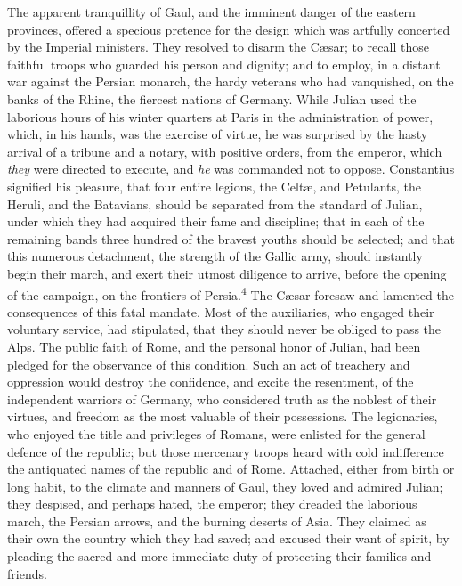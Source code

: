 
The apparent tranquillity of Gaul, and the imminent danger of the
eastern provinces, offered a specious pretence for the design
which was artfully concerted by the Imperial ministers. They
resolved to disarm the Cæsar; to recall those faithful troops who
guarded his person and dignity; and to employ, in a distant war
against the Persian monarch, the hardy veterans who had
vanquished, on the banks of the Rhine, the fiercest nations of
Germany. While Julian used the laborious hours of his winter
quarters at Paris in the administration of power, which, in his
hands, was the exercise of virtue, he was surprised by the hasty
arrival of a tribune and a notary, with positive orders, from the
emperor, which \textit{they} were directed to execute, and \textit{he} was
commanded not to oppose. Constantius signified his pleasure, that
four entire legions, the Celtæ, and Petulants, the Heruli, and
the Batavians, should be separated from the standard of Julian,
under which they had acquired their fame and discipline; that in
each of the remaining bands three hundred of the bravest youths
should be selected; and that this numerous detachment, the
strength of the Gallic army, should instantly begin their march,
and exert their utmost diligence to arrive, before the opening of
the campaign, on the frontiers of Persia.\textsuperscript{4} The Cæsar foresaw and
lamented the consequences of this fatal mandate. Most of the
auxiliaries, who engaged their voluntary service, had stipulated,
that they should never be obliged to pass the Alps. The public
faith of Rome, and the personal honor of Julian, had been pledged
for the observance of this condition. Such an act of treachery
and oppression would destroy the confidence, and excite the
resentment, of the independent warriors of Germany, who
considered truth as the noblest of their virtues, and freedom as
the most valuable of their possessions. The legionaries, who
enjoyed the title and privileges of Romans, were enlisted for the
general defence of the republic; but those mercenary troops heard
with cold indifference the antiquated names of the republic and
of Rome. Attached, either from birth or long habit, to the
climate and manners of Gaul, they loved and admired Julian; they
despised, and perhaps hated, the emperor; they dreaded the
laborious march, the Persian arrows, and the burning deserts of
Asia. They claimed as their own the country which they had saved;
and excused their want of spirit, by pleading the sacred and more
immediate duty of protecting their families and friends.

